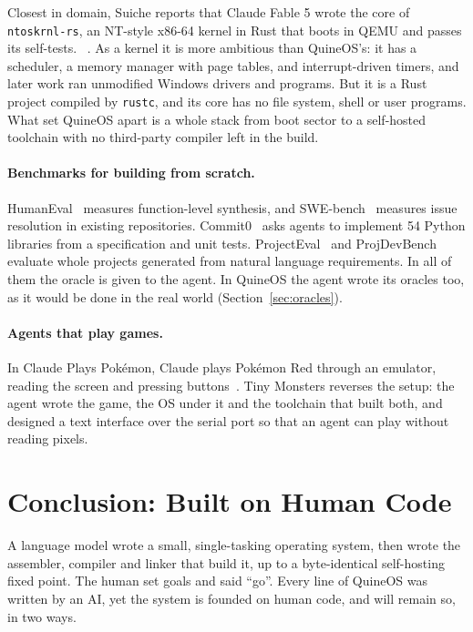 \documentclass{article}
\newcommand{\sysname}{QuineOS}
\begin{document}
Closest in domain, Suiche
reports that Claude Fable 5 wrote the core of \texttt{ntoskrnl-rs}, an NT-style x86-64
kernel in Rust that boots in QEMU and passes its self-tests. ~\cite{suiche2026ntoskrnl}. As a kernel it is more ambitious than
\sysname{}'s: it has a scheduler, a memory manager with page tables, and interrupt-driven
timers, and later work ran unmodified Windows drivers and programs. But it is a Rust
project compiled by \texttt{rustc}, and its core has no file system, shell or user
programs. What set \sysname{} apart is a whole stack from boot sector to a
self-hosted toolchain with no third-party compiler left in the build.

\paragraph{Benchmarks for building from scratch.} HumanEval~\cite{chen2021codex} measures
function-level synthesis, and SWE-bench~\cite{jimenez2024swebench} measures issue
resolution in existing repositories. Commit0~\cite{zhao2025commit0} asks agents to
implement 54 Python libraries from a specification and unit tests. ProjectEval~\cite{liu2025projecteval}
and ProjDevBench~\cite{lu2026projdevbench} evaluate whole projects generated from natural
language requirements. In all of them the oracle is given to the agent. In \sysname{} the
agent wrote its oracles too, as it would be done in the real world (Section~\ref{sec:oracles}).

\paragraph{Agents that play games.} In Claude Plays Pokémon, Claude plays Pokémon Red
through an emulator, reading the screen and pressing buttons~\cite{techcrunch2025pokemon}.
Tiny Monsters reverses the setup: the agent wrote the game, the OS under it and the
toolchain that built both, and designed a text interface over the serial port so that an
agent can play without reading pixels.

\section{Conclusion: Built on Human Code}\label{sec:conclusion}

A language model wrote a small, single-tasking operating system, then wrote the
assembler, compiler and linker that build it, up to a byte-identical self-hosting fixed
point. The human set goals and said ``go''. Every line of \sysname{} was written by an AI,
yet the system is founded on human code, and will remain so, in two ways.
\end{document}

